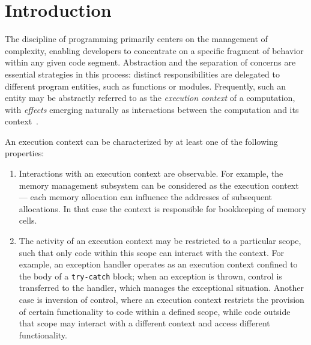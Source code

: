 \documentclass[acmsmall,review,screen]{acmart}
\begin{document}



\maketitle


\section{Introduction} \label{sec:intro}


The discipline of programming primarily centers on the management of complexity, enabling developers to concentrate on a specific fragment of behavior within any given code segment.
Abstraction and the separation of concerns are essential strategies in this process: distinct responsibilities are delegated to different program entities, such as functions or modules.
Frequently, such an entity may be abstractly referred to as the \textit{execution context} of a computation, with \textit{effects} emerging naturally as interactions between the computation and its context~\cite{kiselyov2013extensible}.

An execution context can be characterized by at least one of the following properties:
\begin{enumerate}
    \item Interactions with an execution context are observable.
    For example, the memory management subsystem can be considered as the execution context --- each memory allocation can influence the addresses of subsequent allocations.
    In that case the context is responsible for bookkeeping of memory cells.
    \item The activity of an execution context may be restricted to a particular scope, such that only code within this scope can interact with the context.
    For example, an exception handler operates as an execution context confined to the body of a \texttt{try-catch} block; when an exception is thrown, control is transferred to the handler, which manages the exceptional situation.
    Another case is inversion of control, where an execution context restricts the provision of certain functionality to code within a defined scope, while code outside that scope may interact with a different context and access different functionality.
\end{enumerate}
\end{document}
